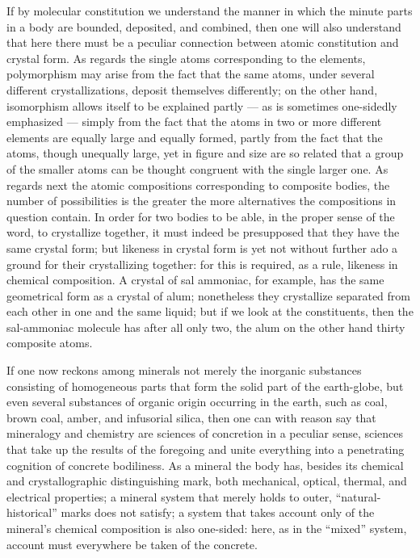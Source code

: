 \documentclass[12pt]{book}
\begin{document}
If by molecular constitution we understand the manner in which the minute parts in a
body are bounded, deposited, and combined, then one will also understand that here
there must be a peculiar connection between atomic constitution and crystal form. As
regards the single atoms corresponding to the elements, polymorphism may arise from the
fact that the same atoms, under several different crystallizations, deposit themselves
differently; on the other hand, isomorphism allows itself to be explained partly --- as
is sometimes one-sidedly emphasized --- simply from the fact that the atoms in two or
more different elements are equally large and equally formed, partly from the fact that
the atoms, though unequally large, yet in figure and size are so related that a group of
the smaller atoms can be thought congruent with the single larger one. As regards next
the atomic compositions corresponding to composite bodies, the number of possibilities
is the greater the more alternatives the compositions in question contain. In order for
two bodies to be able, in the proper sense of the word, to crystallize together, it
must indeed be presupposed that they have the same crystal form; but likeness in
crystal form is yet not without further ado a ground for their crystallizing together:
for this is required, as a rule, likeness in chemical composition. A crystal of sal
ammoniac, for example, has the same geometrical form as a crystal of alum; nonetheless
they crystallize separated from each other in one and the same liquid; but if we look
at the constituents, then the sal-ammoniac molecule has after all only two, the alum on
the other hand thirty composite atoms.

If one now reckons among minerals not merely the inorganic substances consisting of
homogeneous parts that form the solid part of the earth-globe, but even several
substances of organic origin occurring in the earth, such as coal, brown coal, amber,
and infusorial silica, then one can with reason say that mineralogy and chemistry are
sciences of concretion in a peculiar sense, sciences that take up the results of the
foregoing and unite everything into a penetrating cognition of concrete bodiliness. As
a mineral the body has, besides its chemical and crystallographic distinguishing mark,
both mechanical, optical, thermal, and electrical properties; a mineral system that
merely holds to outer, ``natural-historical'' marks does not satisfy; a system that
takes account only of the mineral's chemical composition is also one-sided: here, as in
the ``mixed'' system, account must everywhere be taken of the concrete.
\end{document}
